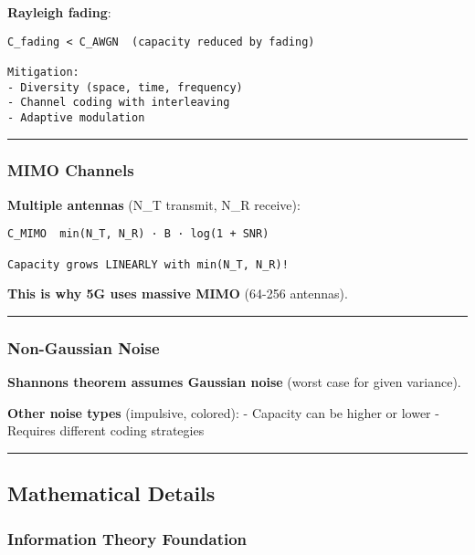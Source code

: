 \textbf{Rayleigh fading}:

\begin{verbatim}
C_fading < C_AWGN  (capacity reduced by fading)

Mitigation:
- Diversity (space, time, frequency)
- Channel coding with interleaving
- Adaptive modulation
\end{verbatim}

\begin{center}\rule{0.5\linewidth}{0.5pt}\end{center}

\subsubsection{MIMO Channels}\label{mimo-channels}

\textbf{Multiple antennas} (N\_T transmit, N\_R receive):

\begin{verbatim}
C_MIMO  min(N_T, N_R) · B · log(1 + SNR)

Capacity grows LINEARLY with min(N_T, N_R)!
\end{verbatim}

\textbf{This is why 5G uses massive MIMO} (64-256 antennas).

\begin{center}\rule{0.5\linewidth}{0.5pt}\end{center}

\subsubsection{Non-Gaussian Noise}\label{non-gaussian-noise}

\textbf{Shannon\textquotesingle s theorem assumes Gaussian noise} (worst
case for given variance).

\textbf{Other noise types} (impulsive, colored): - Capacity can be
higher or lower - Requires different coding strategies

\begin{center}\rule{0.5\linewidth}{0.5pt}\end{center}

\subsection{\texorpdfstring{ Mathematical
Details}{ Mathematical Details}}\label{mathematical-details}

\subsubsection{Information Theory
Foundation}\label{information-theory-foundation}

